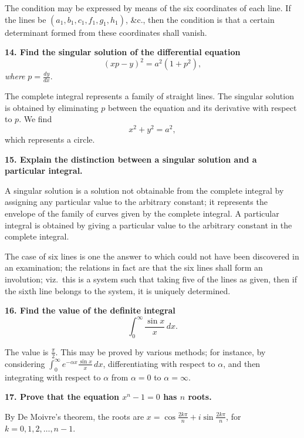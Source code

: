 \documentclass[11pt,a4paper]{article}
\theoremstyle{plain}
\theoremstyle{definition}
\theoremstyle{remark}
\begin{document}
The condition may be expressed by means of the six coordinates of each line. If the lines be $(a_1, b_1, c_1, f_1, g_1, h_1)$, \&c., then the condition is that a certain determinant formed from these coordinates shall vanish.

\smallskip

\noindent\textbf{14. Find the singular solution of the differential equation}
\[
(xp - y)^2 = a^2 (1 + p^2),
\]
\textit{where} $p = \frac{dy}{dx}$.

The complete integral represents a family of straight lines. The singular solution is obtained by eliminating $p$ between the equation and its derivative with respect to $p$. We find
\[
x^2 + y^2 = a^2,
\]
which represents a circle.

\smallskip

\noindent\textbf{15. Explain the distinction between a singular solution and a particular integral.}

A singular solution is a solution not obtainable from the complete integral by assigning any particular value to the arbitrary constant; it represents the envelope of the family of curves given by the complete integral. A particular integral is obtained by giving a particular value to the arbitrary constant in the complete integral.

The case of six lines is one the answer to which could not have been discovered in an examination; the relations in fact are that the six lines shall form an involution; viz.\ this is a system such that taking five of the lines as given, then if the sixth line belongs to the system, it is uniquely determined.

\smallskip

\noindent\textbf{16. Find the value of the definite integral}
\[
\int_0^{\infty} \frac{\sin x}{x}\, dx.
\]

The value is $\frac{\pi}{2}$. This may be proved by various methods; for instance, by considering $\int_0^{\infty} e^{-\alpha x} \frac{\sin x}{x}\, dx$, differentiating with respect to $\alpha$, and then integrating with respect to $\alpha$ from $\alpha = 0$ to $\alpha = \infty$.

\smallskip

\noindent\textbf{17. Prove that the equation $x^n - 1 = 0$ has $n$ roots.}

By De Moivre's theorem, the roots are $x = \cos \frac{2k\pi}{n} + i \sin \frac{2k\pi}{n}$, for $k = 0, 1, 2, \ldots, n-1$.

\smallskip
\end{document}
